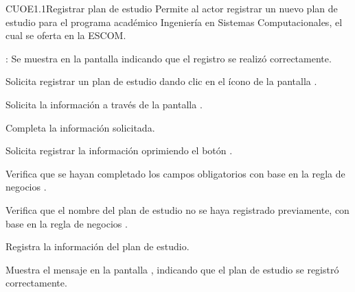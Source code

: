 \begin{UseCase}{CUOE1.1}{Registrar plan de estudio}{	
	Permite al actor registrar un nuevo plan de estudio para el programa académico Ingeniería en Sistemas Computacionales, el cual se oferta en la ESCOM.
}
{\begin{UClist}
			\UCli {}: Se muestra en la pantalla  indicando que el registro se realizó correctamente.
		\end{UClist}
	}
\end{UseCase}

\begin{UCtrayectoria}
	\UCpaso [\UCactor] Solicita registrar un plan de estudio dando clic en el ícono \btnRegistrar de la pantalla . 
	
	\UCpaso[\UCsist] Solicita la información a través de la pantalla .
	
	\UCpaso [\UCactor] Completa la información solicitada. \label{CUOE1.1:CompletaInfo}
	
	\UCpaso [\UCactor] Solicita registrar la información oprimiendo el botón . 
	
	\UCpaso [\UCsist] Verifica que se hayan completado los campos obligatorios con base en la regla de negocios . 
		
	\UCpaso [\UCsist] Verifica que el nombre del plan de estudio no se haya registrado previamente, con base en la regla de negocios . 
			
	\UCpaso [\UCsist] Registra la información del plan de estudio.
	
	\UCpaso [\UCsist] Muestra el mensaje  en la pantalla , indicando que el plan de estudio se registró correctamente.	
	
\end{UCtrayectoria}

